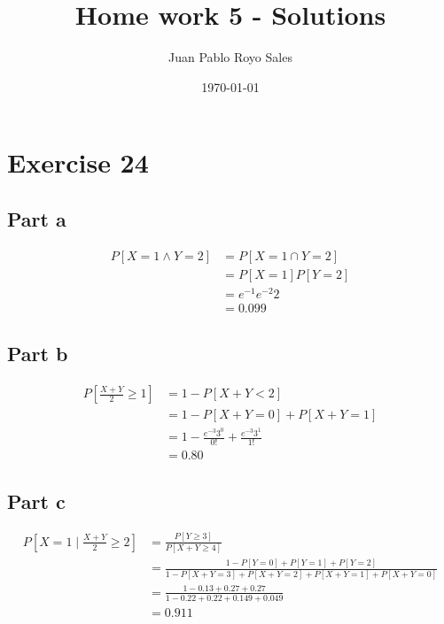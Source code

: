 \documentclass[12pt, a4paper]{article}
\title{Home work 5 - Solutions}
\author{Juan Pablo Royo Sales}
\date\today
\begin{document}
\maketitle

\section{Exercise 24}
\subsection{Part a}

\begin{align*}
  P[X = 1 \land Y = 2] &= P[X = 1 \cap Y = 2]\\
                       &= P[X = 1] P[Y = 2]\\
                       &= e^{-1} e^{-2} 2 \\
                       &= 0.099
\end{align*}

\subsection{Part b}

\begin{align*}
  P[\frac{X+Y}{2} \geq 1] &= 1 - P[X+Y < 2]\\
                          &= 1 - P[X+Y = 0] + P[X+Y = 1]\\
                          &= 1 - \frac{e^{-3} 3^0}{0!} + \frac{e^{-3} 3^1}{1!}\\
                          &= 0.80
\end{align*}

\subsection{Part c}

\begin{align*}
  P[X = 1 \mid \frac{X+Y}{2} \geq 2] &= \frac{P[Y \geq 3]}{P[X+Y \geq 4]}\\
                                     &= \frac{1 - P[Y = 0] + P[Y = 1] + P[Y = 2]}{1 - P[X+Y=3] + P[X+Y=2] + P[X+Y=1] + P[X+Y=0]}\\
                                     &= \frac{1 - 0.13 + 0.27 + 0.27}{1 - 0.22 + 0.22 + 0.149 + 0.049}\\
                                     &= 0.911
\end{align*}
\end{document}

